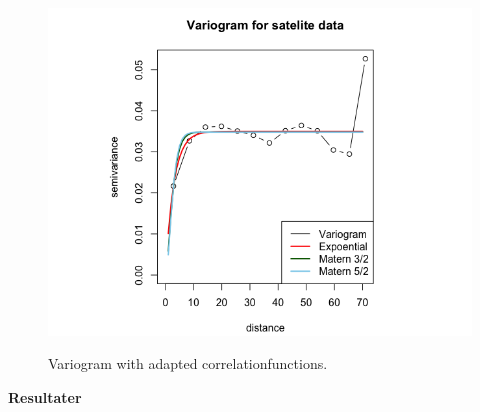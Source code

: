 \begin{figure}[!htb]
\hspace{-50pt}
     \includegraphics[width=1.3\linewidth]{figurer/variogram_covariancefunctions.png}
     \label{fig:variogram}
     \caption{Variogram with adapted correlationfunctions.}
\end{figure}



\textbf{Resultater} \\
